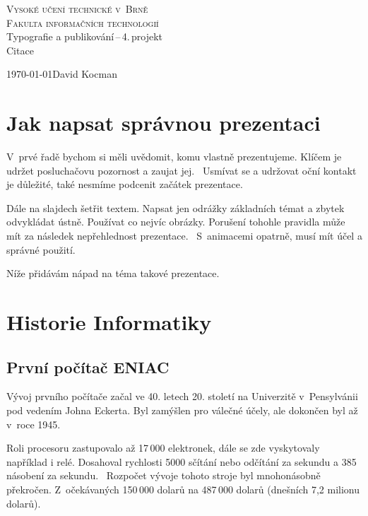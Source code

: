 \documentclass[11pt]{article}
\begin{document}
\begin{titlepage}
\begin{center}
    \textsc{\Huge{Vysoké učení technické v~Brně} \vspace{0.4em} \\
    \huge{Fakulta informačních technologií}}\\
    {\LARGE{Typografie a publikování\,--\,4.\,projekt}\vspace{0.3em}\\
    \Huge{Citace}}    
\end{center}
{\Large \today \hfill David Kocman}
\end{titlepage}
\section{Jak napsat správnou prezentaci}
V~prvé řadě bychom si měli uvědomit, komu vlastně prezentujeme. Klíčem je udržet posluchačovu pozornost a zaujat jej.~\cite{prezentacePP} Usmívat se a udržovat oční kontakt je důležité, také nesmíme podcenit začátek prezentace.~\cite{tipyPrezENG}

Dále na slajdech šetřit textem. Napsat jen odrážky základních témat a zbytek odvykládat ústně. Používat co nejvíc obrázky. Porušení tohohle pravidla může mít za následek nepřehlednost prezentace.~\cite{textPrez} S~animacemi opatrně, musí mít účel a správné použití.~\cite{prezentacePP}

Níže přidávám nápad na téma takové prezentace.

\section{Historie Informatiky}
\subsection{První počítač ENIAC}
Vývoj prvního počítače začal ve 40. letech 20. století na Univerzitě v~Pensylvánii pod vedením Johna Eckerta. Byl zamýšlen pro válečné účely, ale dokončen byl až v~roce 1945. ~\cite{ENIAChis}~\cite{21ENIAC}

Roli procesoru zastupovalo až 17\,000 elektronek, dále se zde vyskytovaly například i relé. Dosahoval rychlosti 5000 sčítání nebo odčítání za sekundu a 385 násobení za sekundu.~\cite{matejkaBach} Rozpočet vývoje tohoto stroje byl mnohonásobně překročen. Z~očekávaných 150\,000 dolarů na 487\,000 dolarů (dnešních 7,2 milionu dolarů).~\cite{article21}
\end{document}
